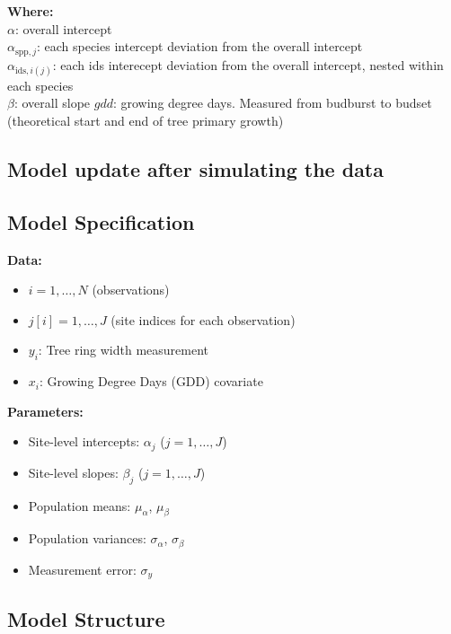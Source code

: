 \documentclass[a4paper,12pt]{article}
\begin{document}
\textbf{Where:} \\ 
$\alpha$: overall intercept \\ 
$\alpha_{\text{spp}, j}$: each species intercept deviation from the overall intercept\\ 
$\alpha_{\text{ids}, i(j)}$: each ids interecept deviation from the overall intercept, nested within each species\\
$\beta$: overall slope
$gdd$: growing degree days. Measured from budburst to budset (theoretical start and end of tree primary growth)


\subsection*{Model update after simulating the data}

\subsection*{Model Specification}

\textbf{Data:}
\begin{itemize}
    \item $i = 1, \dots, N$ (observations)
    \item $j[i] = 1, \dots, J$ (site indices for each observation)
    \item $y_i$: Tree ring width measurement
    \item $x_i$: Growing Degree Days (GDD) covariate
\end{itemize}

\textbf{Parameters:}
\begin{itemize}
    \item Site-level intercepts: $\alpha_j$ ($j = 1, \dots, J$)
    \item Site-level slopes: $\beta_j$ ($j = 1, \dots, J$)
    \item Population means: $\mu_\alpha$, $\mu_\beta$
    \item Population variances: $\sigma_\alpha$, $\sigma_\beta$
    \item Measurement error: $\sigma_y$
\end{itemize}

\subsection*{Model Structure}
\end{document}
